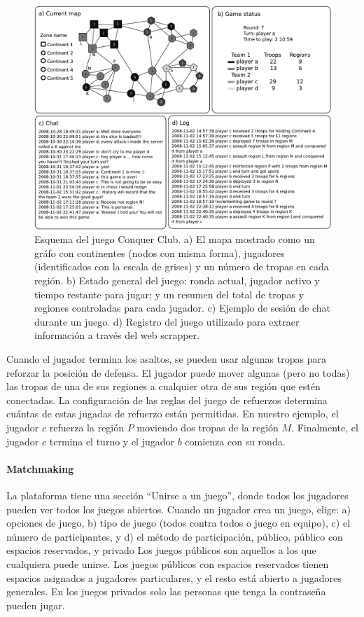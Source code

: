 \documentclass[a4paper,11pt]{book}
\theoremstyle{definition}
\begin{document}
\begin{figure}[ht!]
    \centering
    \includegraphics[width=0.8\linewidth]{figures/Fig5}
    \caption{
    Esquema del juego Conquer Club. a) El mapa mostrado como un gr\'afo con continentes (nodos con misma forma), jugadores (identificados con la escala de grises) y un n\'umero de tropas en cada regi\'on.
    b) Estado general del juego: ronda actual, jugador activo y tiempo restante para jugar; y un resumen del total de tropas y regiones controladas para cada jugador.
    c) Ejemplo de sesi\'on de chat durante un juego.
    d) Registro del juego utilizado para extraer informaci\'on a trav\'es del web scrapper.
    }
    \label{conquerImage}
\end{figure}

Cuando el jugador termina los asaltos, se pueden usar algunas tropas para reforzar la posici\'on de defensa.
%
El jugador puede mover algunas (pero no todas) las tropas de una de sus regiones a cualquier otra de sus regi\'on que est\'en conectadas.
%
La configuraci\'on de las reglas del juego de refuerzos determina cu\'antas de estas jugadas de refuerzo est\'an permitidas.
%
En nuestro ejemplo, el jugador $c$ refuerza la regi\'on $P$ moviendo dos tropas de la regi\'on $M$.
%
Finalmente, el jugador $c$ termina el turno y el jugador $b$ comienza con su ronda.

\paragraph{Matchmaking}

La plataforma tiene una secci\'on ``Unirse a un juego'', donde todos los jugadores pueden ver todos los juegos abiertos.
%
Cuando un jugador crea un juego, elige: a) opciones de juego, b) tipo de juego (todos contra todos o juego en equipo), c) el n\'umero de participantes, y d) el m\'etodo de participaci\'on, p\'ublico, p\'ublico con espacios reservados, y privado
%
Los juegos p\'ublicos son aquellos a los que cualquiera puede unirse.
%
Los juegos p\'ublicos con espacios reservados tienen espacios asignados a jugadores particulares, y el resto est\'a abierto a jugadores generales.
%
En los juegos privados solo las personas que tenga la contrase\~na pueden jugar.
\end{document}
